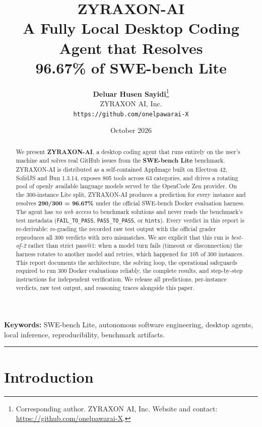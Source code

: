 \documentclass[11pt,a4paper]{article}
\title{\vspace{-2.2cm}\textbf{\color{zyink}ZYRAXON-AI}\\[0.3em]
\Large A Fully Local Desktop Coding Agent that Resolves\\[0.15em]
\textbf{96.67\%} of SWE-bench Lite}
\author{%
  \textbf{Deluar Husen Sayidi}\thanks{Corresponding author. ZYRAXON AI, Inc. Website and contact: \url{https://github.com/onelpawarai-X}.}\\
  ZYRAXON AI, Inc.\\
  \texttt{https://github.com/onelpawarai-X}%
  }
\date{October 2026}
\begin{document}
\maketitle
\thispagestyle{fancy}

\begin{abstract}
\noindent
We present \textbf{ZYRAXON-AI}, a desktop coding agent that runs entirely
on the user's machine and solves real GitHub issues from the
\textbf{SWE-bench Lite} benchmark. ZYRAXON-AI is distributed as a self-contained
AppImage built on Electron 42, SolidJS and Bun 1.3.14, exposes 805 tools across 63
categories, and drives a rotating pool of openly available language models served by
the OpenCode Zen provider. On the 300-instance Lite split, ZYRAXON-AI produces a
prediction for every instance and resolves \textbf{290/300 = 96.67\%} under the official
SWE-bench Docker evaluation harness. The agent has \emph{no web access} to benchmark
solutions and never reads the benchmark's test metadata
(\texttt{FAIL\_TO\_PASS}, \texttt{PASS\_TO\_PASS}, or \texttt{hints}). Every verdict in
this report is re-derivable: re-grading the recorded raw test output with the official
grader reproduces all 300 verdicts with zero mismatches. We are explicit that this run
is \emph{best-of-2} rather than strict pass@1: when a model turn fails (timeout or
disconnection) the harness rotates to another model and retries, which happened for 105
of 300 instances. This report documents the architecture, the solving loop, the
operational safeguards required to run 300 Docker evaluations reliably, the complete
results, and step-by-step instructions for independent verification. We release all
predictions, per-instance verdicts, raw test output, and reasoning traces alongside
this paper.
\end{abstract}

\vspace{0.5em}
\noindent\textbf{Keywords:} SWE-bench Lite, autonomous software engineering,
desktop agents, local inference, reproducibility, benchmark artifacts.

\vspace{1em}
\hrule
\vspace{1em}

\tableofcontents
\newpage

\section{Introduction}
\end{document}
